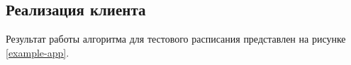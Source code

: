 \subsection{Реализация клиента}

Результат работы алгоритма для тестового расписания представлен на рисунке \ref{example-app}.

